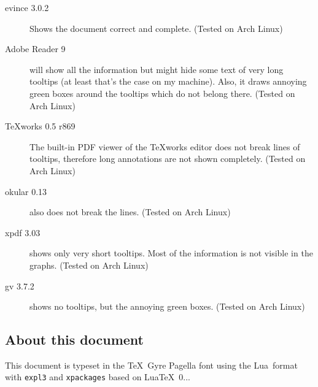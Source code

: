 \begin{description}
\item[evince 3.0.2] Shows the document correct and complete. (Tested on Arch Linux)

\item[Adobe Reader 9] will show all the information but might hide some text of very long tooltips (at least that's the case on my machine). Also, it draws annoying green boxes around the tooltips which do not belong there. (Tested on Arch Linux)

\item[\TeX works 0.5 r869] The built-in PDF viewer of the \TeX works editor does not break lines of tooltips, therefore long annotations are not shown completely. (Tested on Arch Linux)

\item[okular 0.13] also does not break the lines. (Tested on Arch Linux)

\item[xpdf 3.03] shows only very short tooltips. Most of the information is not visible in the graphs. (Tested on Arch Linux)

\item[gv 3.7.2] shows no tooltips, but the annoying green boxes. (Tested on Arch Linux)
\end{description}

\subsection*{About this document}
This document is typeset in the \TeX\ Gyre Pagella font using the Lua\LaTeXe\ format with \verb|expl3| and \verb|xpackages| based on Lua\TeX\ 0.\the\luatexversion.\luatexrevision.



\label{sec:tree}
\Large
\centering

